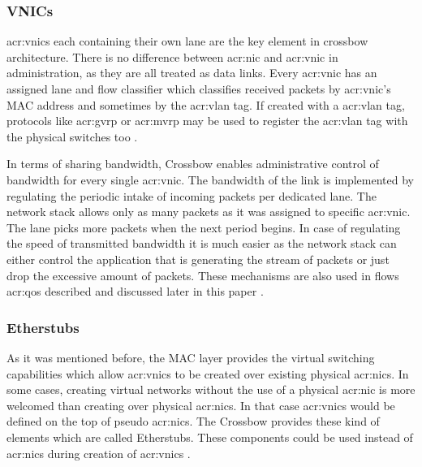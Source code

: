 \documentclass[11pt,openany]{book}
\begin{document}
                
        \subsubsection{VNICs}
        
          \gls{acr:vnic}s each containing their own lane are the key element in crossbow architecture. There is no
          difference between \gls{acr:nic} and \gls{acr:vnic} in administration, as they are all treated as data links.
          Every \gls{acr:vnic} has an assigned lane and flow classifier which classifies received packets by
          \gls{acr:vnic}'s MAC address and sometimes by the \gls{acr:vlan} tag.  If created with a \gls{acr:vlan} tag,
          protocols like \gls{acr:gvrp} or \gls{acr:mvrp} may be used to register the \gls{acr:vlan} tag with the
          physical switches too \cite{crossbow}.	

          In terms of sharing bandwidth, Crossbow enables administrative control of bandwidth for every single
          \gls{acr:vnic}. The bandwidth of the link is implemented by regulating the periodic intake of incoming packets
          per dedicated lane. The network stack allows only as many packets as it was assigned to specific
          \gls{acr:vnic}. The lane picks more packets when the next period begins. In case of regulating the speed of
          transmitted bandwidth it is much easier as the network stack can either control the application that is
          generating the stream of packets or just drop the excessive amount of packets. These mechanisms are also used
          in flows \gls{acr:qos} described and discussed later in this paper \cite{crossbow}.


        \subsubsection{Etherstubs}

          As it was mentioned before, the MAC layer provides the virtual switching capabilities which allow
          \gls{acr:vnic}s to be created over existing physical \gls{acr:nic}s.  In some cases, creating virtual networks
          without the use of a physical \gls{acr:nic} is more welcomed than creating over physical \gls{acr:nic}s. In
          that case \gls{acr:vnic}s would be defined on the top of pseudo \gls{acr:nic}s.  The Crossbow provides these
          kind of elements which are called Etherstubs. These components could be used instead of \gls{acr:nic}s during
          creation of \gls{acr:vnic}s \cite{crossbow}.
\end{document}
